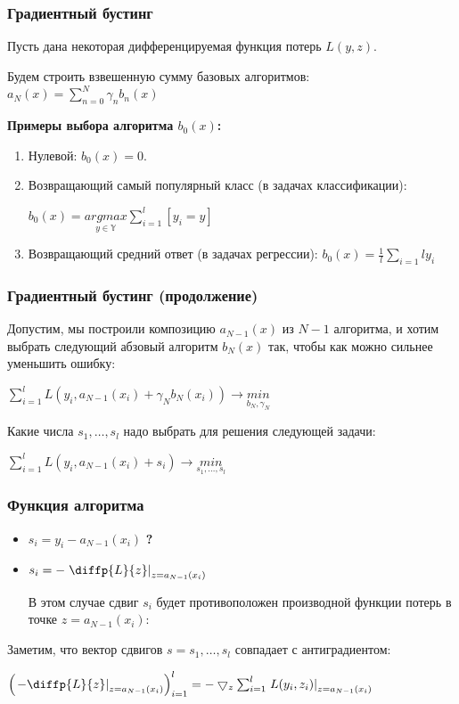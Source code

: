 \documentclass[fleqn,pdf, 9pt, usenames, dvipsnames, unicode, hyperref={bookmarks=true,bookmarksopen=false, bookmarksnumbered}]{beamer}
\begin{document}
\begin{frame}\frametitle{Градиентный бустинг}

Пусть дана некоторая дифференцируемая функция потерь $L(y, z)$. 

Будем строить взвешенную сумму базовых алгоритмов:
$a_N(x) = \sum_{n=0}^{N}\gamma_n b_n(x)$

\textbf{Примеры выбора алгоритма $b_0(x)$:}

\begin{enumerate}
	\item Нулевой: $b_0(x) = 0$.
	\item Возвращающий самый популярный класс (в задачах классификации):
	
	$b_0(x) = \underset{y\in\mathbf{\mathbb{Y}}}{argmax}\sum_{i=1}^{l}[y_i=y]$
	\item Возвращающий средний ответ (в задачах регрессии):	
	$b_0(x) = \frac{1}{l}\sum_{i=1}{l}y_i$
\end{enumerate}

\end{frame}


\begin{frame}\frametitle{Градиентный бустинг (продолжение)}

Допустим, мы построили композицию $a_{N-1}(x)$ из $N-1$ алгоритма, и хотим выбрать следующий абзовый алгоритм $b_N(x)$ так, чтобы как можно сильнее уменьшить ошибку:

$\sum_{i=1}^{l} L\left(y_i,a_{N-1}(x_i) + \gamma_N b_N(x_i)\right)\rightarrow \underset{b_N,\gamma_N}{min}$

Какие числа $s_1,\ldots, s_l$ надо выбрать для решения следующей задачи:

$\sum_{i=1}^{l} L\left(y_i, a_{N-1}(x_i) +s_i\right)\rightarrow \underset{s_1,\ldots, s_l}{min}$

\end{frame}


\begin{frame}\frametitle{Функция алгоритма}

\begin{itemize}
    \item    $s_i = y_i - a_{N-1}(x_i)$ \textbf{?}
    \item    $s_i = - \left. \diffp{L}{z} \right|_{z=a_{N-1}(x_i)}$
    
    В этом случае сдвиг $s_i$ будет противоположен производной функции потерь в точке $z=a_{N-1}(x_i)$:
     
    
\end{itemize}

Заметим, что вектор сдвигов $s = s_1,\ldots, s_l$ совпадает с антиградиентом:

$\left(\left. -\diffp{L}{z}\right|_{z=a_{N-1}(x_i)}\right)^l_{i=1} = -\bigtriangledown_z \sum_{i=1}^{l}\left. L(y_i,z_i) \right|_{z=a_{N-1}(x_i)}$

\end{frame}
\end{document}
